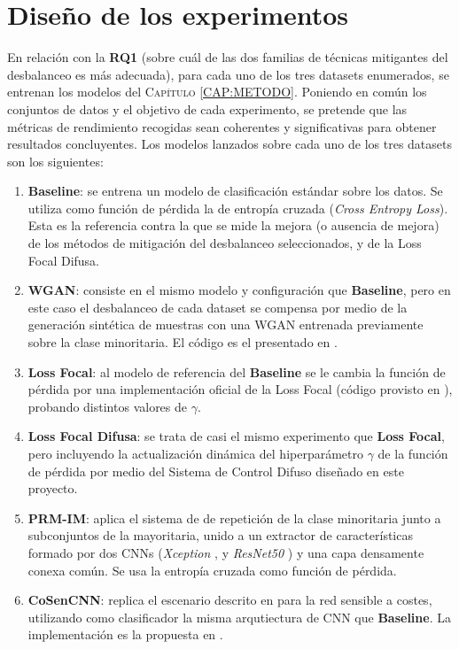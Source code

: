 \section{Diseño de los experimentos\label{SEC:EXPERIMENTOS}}

En relación con la \textbf{RQ1} (sobre cuál de las dos familias de técnicas mitigantes del desbalanceo es más adecuada), para cada uno de los tres datasets enumerados, se entrenan los modelos del \textsc{Capítulo \ref{CAP:METODO}}. Poniendo en común los conjuntos de datos y el objetivo de cada experimento, se pretende que las métricas de rendimiento recogidas sean coherentes y significativas para obtener resultados concluyentes. Los modelos lanzados sobre cada uno de los tres datasets son los siguientes:

\begin{enumerate}
    \fontsize{11pt}{12pt}\selectfont
    \item \textbf{Baseline}: se entrena un modelo de clasificación estándar sobre los datos. Se utiliza como función de pérdida la de entropía cruzada (\textit{Cross Entropy Loss}). Esta es la referencia contra la que se mide la mejora (o ausencia de mejora) de los métodos de mitigación del desbalanceo seleccionados, y de la Loss Focal Difusa.
    \item \textbf{WGAN}: consiste en el mismo modelo y configuración que \textbf{Baseline}, pero en este caso el desbalanceo de cada dataset se compensa por medio de la generación sintética de muestras con una WGAN entrenada previamente sobre la clase minoritaria. El código es el presentado en \citet{arjovsky2017wasserstein}.
    \item \textbf{Loss Focal}: al modelo de referencia del \textbf{Baseline} se le cambia la función de pérdida por una implementación oficial de la Loss Focal (código provisto en \citet{lin2017focal}), probando distintos valores de $\gamma$.
    \item \textbf{Loss Focal Difusa}: se trata de casi el mismo experimento que \textbf{Loss Focal}, pero incluyendo la actualización dinámica del hiperparámetro $\gamma$ de la función de pérdida por medio del Sistema de Control Difuso diseñado en este proyecto.
    \item \textbf{PRM-IM}: aplica el sistema de \citet{liu2022solving} de repetición de la clase minoritaria junto a subconjuntos de la mayoritaria, unido a un extractor de características formado por dos CNNs (\textit{Xception} \cite{chollet2017xception}, y \textit{ResNet50} \cite{he2016deep}) y una capa densamente conexa común. Se usa la entropía cruzada como función de pérdida.
    \item \textbf{CoSenCNN}: replica el escenario descrito en \citet{khan2017cost} para la red sensible a costes, utilizando como clasificador la misma arqutiectura de CNN que \textbf{Baseline}. La implementación es la propuesta en \citet{khan2017cost}.
\end{enumerate}






